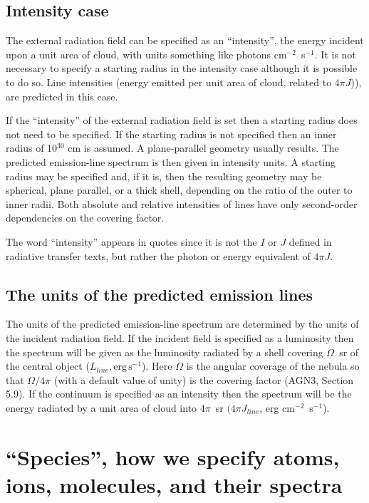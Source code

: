 \subsection{Intensity case}

The external radiation field can be specified as an ``intensity'',
the energy
incident upon a unit area of cloud, with units
something like photons cm$^{-2}$~s$^{-1}$.
It is not necessary to specify a starting radius in the intensity case
although it is possible to do so.
Line intensities (energy emitted per
unit area of cloud, related to $4\pi J$)), are predicted in this case.

If the ``intensity'' of the external radiation field is set then a starting radius does not
need to be specified.
If the starting radius is not specified then an inner
radius of 10$^{30}$ cm is assumed.  A plane-parallel geometry usually results.
The predicted emission-line spectrum is then given in intensity units.
A starting radius may be specified and, if it is, then the resulting geometry
may be spherical, plane parallel, or a thick shell, depending on the ratio
of the outer to inner radii.  Both absolute and relative intensities of
lines have only second-order dependencies on the covering factor.

The word ``intensity'' appears in quotes since it is
not the $I$ or $J$ defined in radiative transfer texts, but rather the photon
or energy equivalent of $4\pi J$.

\subsection{The units of the predicted emission lines}

The units of the predicted emission-line spectrum are determined by the
units of the incident radiation field.
If the incident field is specified as a
luminosity then the spectrum will be given as the luminosity radiated by
a shell covering  $\Omega$~sr of the central object ($L_{line}, \mathrm{erg\,
s}^{-1}$).  Here $\Omega$ is the
angular coverage of the nebula so that $\Omega/4\pi$ (with a default value of unity)
is the covering factor (AGN3, Section 5.9).  If the
continuum is specified as an intensity then the spectrum will be the energy
radiated by a unit area of cloud into $4\pi$~sr $(4\pi J_{line}$, erg
cm$^{-2}$~s$^{-1}$).

\section{``Species'', how we specify atoms, ions, molecules, and their spectra}
\label{sec:SpeciesDefine}

